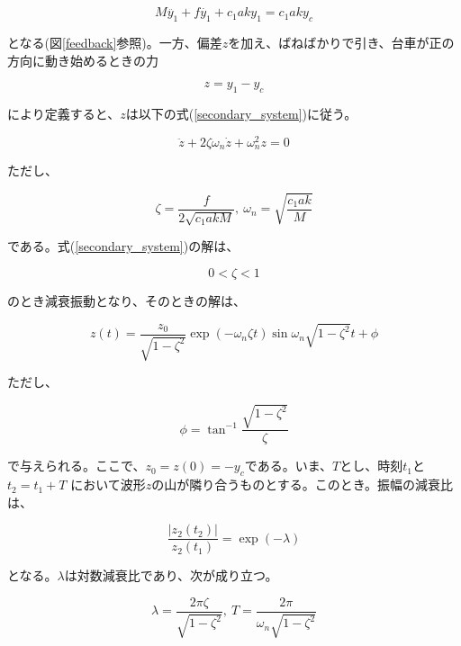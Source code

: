 \documentclass[a4j,11pt,twoside]{jbook}
\begin{document}
\begin{enumerate}
\begin{itemize}
        \begin{equation}
            M \ddot{y_{1}} + f \dot{y_{1}} + c_{1}aky_{1} = c_{1}aky_{c}
        \end{equation}

        となる(図\ref{feedback}参照)。一方、偏差$z$を加え、ばねばかりで引き、台車が正の方向に動き始めるときの力

        \begin{equation}
            z = y_{1} - y_{c}
        \end{equation}

        により定義すると、$z$は以下の式(\ref{secondary_system})に従う。

        \begin{equation}
            \ddot{z} + 2\zeta \omega_{n} \dot{z} + \omega_{n}^2 z = 0
            \label{secondary_system}
        \end{equation}

        ただし、

        \begin{equation}
            \zeta = \frac{f}{2\sqrt{c_{1}akM}},\ \omega_{n} = \sqrt{\frac{c_{1}ak}{M}}
            \label{zeta}
        \end{equation}

        である。式(\ref{secondary_system})の解は、

        $$
            0 < \zeta < 1
        $$

        のとき減衰振動となり、そのときの解は、

        $$
            z(t) = \frac{z_{0}}{\sqrt{1 - \zeta^2}} \exp(-\omega_{n} \zeta t)
            \sin{\omega_{n}} \sqrt{1 - \zeta^2}t + \phi
        $$

        ただし、
        
        $$
            \phi = \tan^{-1}{\frac{\sqrt{1 - \zeta^2}}{\zeta}}
        $$

        で与えられる。ここで、$z_{0} = z(0) = -y_{c}$である。いま、$T$とし、時刻$t_{1}$と$t_{2} = t_{1} + T$
        において波形$z$の山が隣り合うものとする。このとき。振幅の減衰比は、

        \begin{equation}
            \frac{|z_{2}(t_{2})|}{z_{2}(t_{1})} = \exp(-\lambda)
        \end{equation}

        となる。$\lambda$は対数減衰比であり、次が成り立つ。

        \begin{equation}
            \lambda = \frac{2\pi \zeta}{\sqrt{1 - \zeta^2}},\
            T = \frac{2\pi}{\omega_{n} \sqrt{1 - \zeta^2}}
            \label{lambda}
        \end{equation}


\end{itemize}
\end{enumerate}
\end{document}
